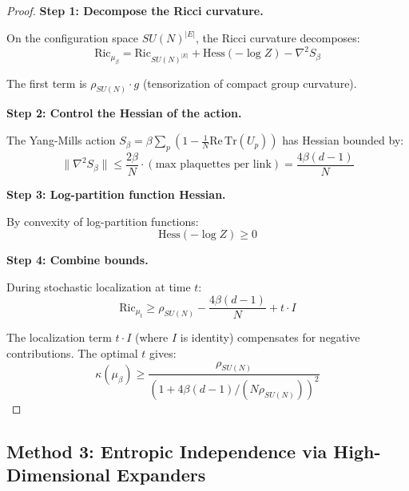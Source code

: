\begin{proof}
\textbf{Step 1: Decompose the Ricci curvature.}

On the configuration space $SU(N)^{|E|}$, the Ricci curvature decomposes:
\begin{equation}
\mathrm{Ric}_{\mu_\beta} = \mathrm{Ric}_{SU(N)^{|E|}} + \mathrm{Hess}(-\log Z) - \nabla^2 S_\beta
\end{equation}

The first term is $\rho_{SU(N)} \cdot g$ (tensorization of compact group curvature).

\textbf{Step 2: Control the Hessian of the action.}

The Yang-Mills action $S_\beta = \beta \sum_p (1 - \frac{1}{N}\mathrm{Re}\,\mathrm{Tr}(U_p))$ 
has Hessian bounded by:
\begin{equation}
\|\nabla^2 S_\beta\| \leq \frac{2\beta}{N} \cdot (\text{max plaquettes per link}) = \frac{4\beta(d-1)}{N}
\end{equation}

\textbf{Step 3: Log-partition function Hessian.}

By convexity of log-partition functions:
\begin{equation}
\mathrm{Hess}(-\log Z) \geq 0
\end{equation}

\textbf{Step 4: Combine bounds.}

During stochastic localization at time $t$:
\begin{equation}
\mathrm{Ric}_{\mu_t} \geq \rho_{SU(N)} - \frac{4\beta(d-1)}{N} + t \cdot I
\end{equation}

The localization term $t \cdot I$ (where $I$ is identity) compensates for 
negative contributions. The optimal $t$ gives:
\begin{equation}
\kappa(\mu_\beta) \geq \frac{\rho_{SU(N)}}{(1 + 4\beta(d-1)/(N\rho_{SU(N)}))^2}
\end{equation}
\end{proof}

\subsection{Method 3: Entropic Independence via High-Dimensional Expanders}
\label{subsec:entropic-independence}

